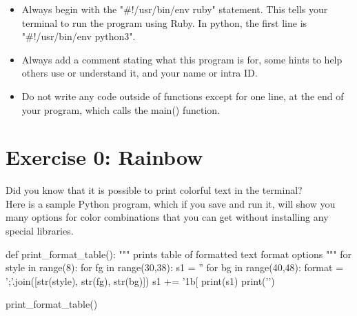 \documentclass{42-en}
\begin{document}
\begin{itemize}
	\item Always begin with the "\#!/usr/bin/env ruby" statement. This tells your terminal to run the program using Ruby. In python, the first line is "\#!/usr/bin/env python3".
	\item Always add a comment stating what this program is for, some hints to help others use or understand it, and your name or intra ID.
	\item Do not write any code outside of functions except for one line, at the end of your program, which calls the main() function.
\end{itemize}

\startexercices


\chapter{Exercise 0: Rainbow}

\makeheaderfiles

Did you know that it is possible to print colorful text in the terminal?\\

Here is a sample Python program, which if you save and run it, will show you many options for color combinations that you can get without installing any special libraries.

\begin{42pycode}
def print_format_table():
    """
    prints table of formatted text format options
    """
    for style in range(8):
        for fg in range(30,38):
            s1 = ''
            for bg in range(40,48):
                format = ';'.join([str(style), str(fg), str(bg)])
                s1 += '\x1b[%
            print(s1)
        print('\n')

print_format_table()
\end{42pycode}
\end{document}
